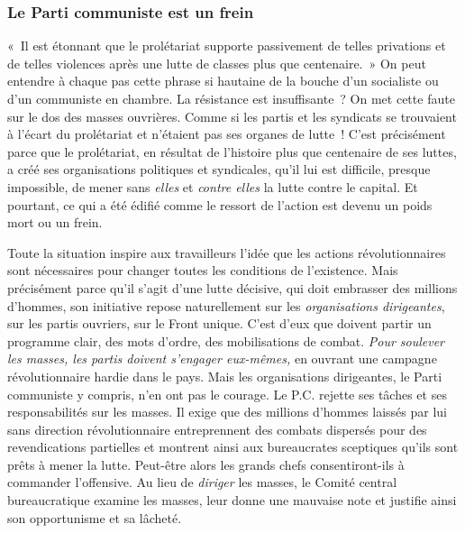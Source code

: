 \documentclass[french,twoside]{book} %
\begin{document}
 \subsubsection[{Le Parti communiste est un frein}]{Le Parti communiste est un frein}
\noindent « Il est étonnant que le prolétariat supporte passivement de telles privations et de telles violences après une lutte de classes plus que centenaire. » On peut entendre à chaque pas cette phrase si hautaine de la bouche d’un socialiste ou d’un communiste en chambre. La résistance est insuffisante ? On met cette faute sur le dos des masses ouvrières. Comme si les partis et les syndicats se trouvaient à l’écart du prolétariat et n’étaient pas ses organes de lutte ! C’est précisément parce que le prolétariat, en résultat de l’histoire plus que centenaire de ses luttes, a créé ses organisations politiques et syndicales, qu’il lui est difficile, presque impossible, de mener sans \emph{elles} et \emph{contre elles} la lutte contre le capital. Et pourtant, ce qui a été édifié comme le ressort de l’action est devenu un poids mort ou un frein.\par
Toute la situation inspire aux travailleurs l’idée que les actions révolutionnaires sont nécessaires pour changer toutes les conditions de l’existence. Mais précisément parce qu’il s’agit d’une lutte décisive, qui doit embrasser des millions d’hommes, son initiative repose naturellement sur les \emph{organisations dirigeantes}, sur les partis ouvriers, sur le Front unique. C’est d’eux que doivent partir un programme clair, des mots d’ordre, des mobilisations de combat. \emph{Pour soulever les masses, les partis doivent s’engager eux-mêmes,} en ouvrant une campagne révolutionnaire hardie dans le pays. Mais les organisations dirigeantes, le Parti communiste y compris, n’en ont pas le courage. Le P.C. rejette ses tâches et ses responsabilités sur les masses. Il exige que des millions d’hommes laissés par lui sans direction révolutionnaire entreprennent des combats dispersés pour des revendications partielles et montrent ainsi aux bureaucrates sceptiques qu’ils sont prêts à mener la lutte. Peut-être alors les grands chefs  consentiront-ils à commander l’offensive. Au lieu de \emph{diriger} les masses, le Comité central bureaucratique examine les masses, leur donne une mauvaise note et justifie ainsi son opportunisme et sa lâcheté.
\end{document}
